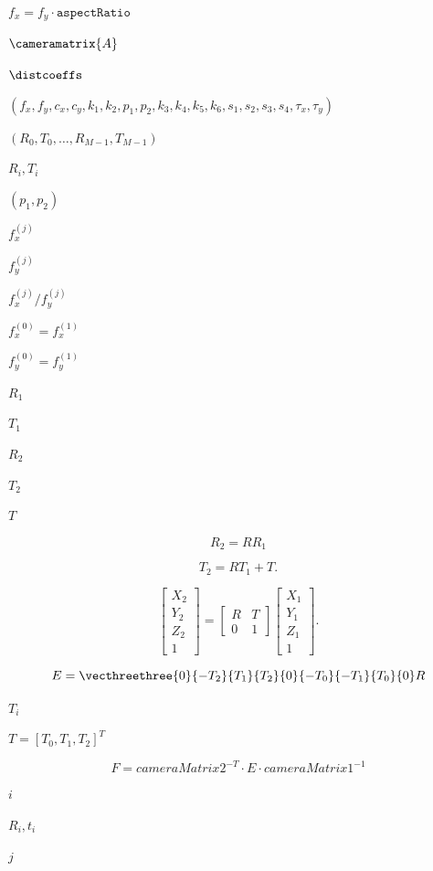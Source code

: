 \documentclass{article}
\begin{document}
$f_x = f_y \cdot \texttt{aspectRatio}$
\pagebreak

$\cameramatrix{A}$
\pagebreak

$\distcoeffs$
\pagebreak

$(f_x, f_y, c_x, c_y, k_1, k_2, p_1, p_2, k_3, k_4, k_5, k_6 , s_1, s_2, s_3,
 s_4, \tau_x, \tau_y)$
\pagebreak

$(R_0, T_0, \dotsc , R_{M - 1}, T_{M - 1})$
\pagebreak

$R_i, T_i$
\pagebreak

$(p_1, p_2)$
\pagebreak

$f^{(j)}_x$
\pagebreak

$f^{(j)}_y$
\pagebreak

$f^{(j)}_x/f^{(j)}_y$
\pagebreak

$f^{(0)}_x=f^{(1)}_x$
\pagebreak

$f^{(0)}_y=f^{(1)}_y$
\pagebreak

$R_1$
\pagebreak

$T_1$
\pagebreak

$R_2$
\pagebreak

$T_2$
\pagebreak

$T$
\pagebreak

\[R_2=R R_1\]
\pagebreak

\[T_2=R T_1 + T.\]
\pagebreak

\[\begin{bmatrix}
X_2 \\
Y_2 \\
Z_2 \\
1
\end{bmatrix} = \begin{bmatrix}
R & T \\
0 & 1
\end{bmatrix} \begin{bmatrix}
X_1 \\
Y_1 \\
Z_1 \\
1
\end{bmatrix}.\]
\pagebreak

\[E= \vecthreethree{0}{-T_2}{T_1}{T_2}{0}{-T_0}{-T_1}{T_0}{0} R\]
\pagebreak

$T_i$
\pagebreak

$T=[T_0, T_1, T_2]^T$
\pagebreak

\[F = cameraMatrix2^{-T}\cdot E \cdot cameraMatrix1^{-1}\]
\pagebreak

$i$
\pagebreak

$R_i, t_i$
\pagebreak

$j$
\pagebreak
\end{document}
